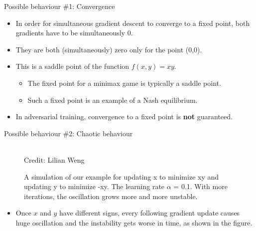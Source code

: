 \begin{frame} {Possible behaviour \#1: Convergence}
  \begin{figure}
    \centering
  \end{figure}
  \begin{itemize}
    \item In order for simultaneous gradient descent to converge to a fixed point, both gradients have to be simultaneously 0.
    \item They are both (simultaneously) zero only for the point (0,0).
    \item This is a saddle point of the function $f(x,y) = xy$.
    \begin{itemize}
       \item The fixed point for a minimax game is typically a saddle point.
      \item Such a fixed point is an example of a Nash equilibrium.
    \end{itemize}
    \item In adversarial training, convergence to a fixed point is \textbf{not} guaranteed.
  \end{itemize}
\end{frame}

\begin{frame} {Possible behaviour \#2: Chaotic behaviour}
  \begin{figure}
    \centering
      \tiny{\\Credit: Lilian Weng}
      \caption{\footnotesize A simulation of our example for updating x to minimize xy and updating y to minimize -xy. The learning rate $\alpha$ = 0.1. With more iterations, the oscillation grows more and more unstable.}
  \end{figure}
  \begin{itemize}
    \item Once $x$ and $y$ have different signs, every following gradient update causes huge oscillation and the instability gets worse in time, as shown in the figure.
  \end{itemize}
\end{frame}


